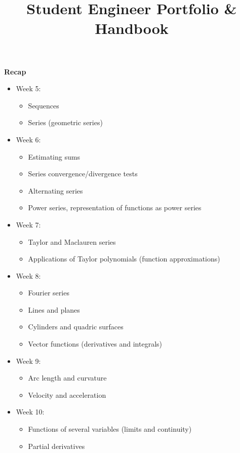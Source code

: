 \documentclass[11pt]{article}
\title{\textbf{Student Engineer Portfolio \& Handbook}}
\date{}
\begin{document}
{\selectfont
\textbf{Recap}

\begin{itemize}
\item Week 5:
\begin{itemize}
\item Sequences
\item Series (geometric series)
\end{itemize}

\item Week 6:
\begin{itemize}
\item Estimating sums
\item Series convergence/divergence tests
\item Alternating series
\item Power series, representation of functions as power series
\end{itemize}

\item Week 7:
\begin{itemize}
\item Taylor and Maclauren series
\item Applications of Taylor polynomials (function approximations)
\end{itemize}

\item Week 8:
\begin{itemize}
\item Fourier series
\item Lines and planes
\item Cylinders and quadric surfaces
\item Vector functions (derivatives and integrals)
\end{itemize}

\item Week 9:
\begin{itemize}
\item Arc length and curvature
\item Velocity and acceleration
\end{itemize}

\item Week 10:
\begin{itemize}
\item Functions of several variables (limits and continuity)
\item Partial derivatives
\end{itemize}
\end{itemize}

}
\end{document}
